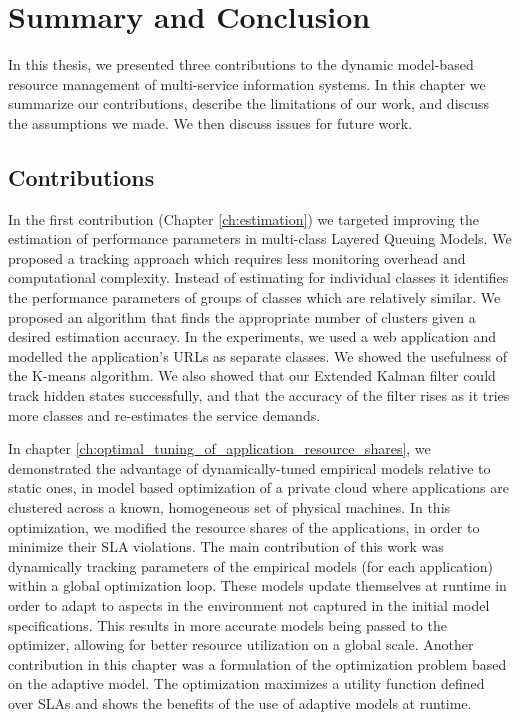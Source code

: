 \chapter{Summary and Conclusion}
\label{ch:conclusion}
In this thesis, we presented three contributions to the dynamic model-based resource management of multi-service information systems. 
 In this chapter we summarize our contributions, describe the limitations of our work, and discuss the assumptions we made. We then discuss issues for future work.  

\section{Contributions}
In the first contribution (Chapter \ref{ch:estimation}) we targeted improving the estimation of performance parameters in multi-class Layered Queuing Models. 
We proposed a tracking approach which requires less monitoring overhead and computational complexity.  Instead of estimating for individual classes it identifies the performance parameters of groups of classes which are relatively similar. We proposed an algorithm that finds the appropriate number of clusters given a desired estimation accuracy. 
In the experiments, we used a web application and modelled the application's URLs as separate classes.  We showed the usefulness of the K-means algorithm. We also showed that our Extended Kalman filter could track hidden states successfully, and that the accuracy of the filter rises as it tries more classes and re-estimates the service demands.

In chapter \ref{ch:optimal_tuning_of_application_resource_shares}, we demonstrated the advantage of dynamically-tuned empirical models relative to static ones, in model based optimization of a private cloud where applications are clustered across a known, homogeneous set of physical machines. In this optimization, we modified the resource shares of the applications, in order to minimize their SLA violations. The main contribution of this work was dynamically tracking parameters of the empirical models (for each application) within a global optimization loop. These models update themselves at runtime in order to adapt to aspects in the environment not captured in the initial model specifications. This results in more accurate models being passed to the optimizer, allowing for better resource utilization on a global scale.  
Another contribution in this chapter was a formulation of the optimization problem based on the adaptive model. The optimization maximizes a utility function defined over SLAs and shows the benefits of the use of adaptive models at runtime.  

